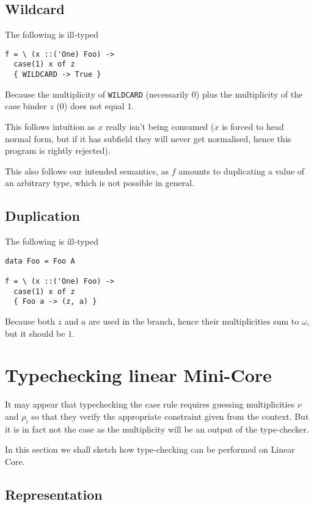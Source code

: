 \documentclass{article}
\begin{document}
\subsection{Wildcard}

The following is ill-typed
\begin{verbatim}
f = \ (x ::('One) Foo) ->
  case(1) x of z
  { WILDCARD -> True }
\end{verbatim}
Because the multiplicity of \verb+WILDCARD+ (necessarily $0$) plus the
multiplicity of the case binder $z$ ($0$) does not equal $1$.

This follows intuition as $x$ really isn't being consumed ($x$ is forced
to head normal form, but if it has subfield they will never get
normalised, hence this program is rightly rejected).

This also follows our intended semantics, as $f$ amounts to
duplicating a value of an arbitrary type, which is not possible in
general.

\subsection{Duplication}

The following is ill-typed
\begin{verbatim}
data Foo = Foo A

f = \ (x ::('One) Foo) ->
  case(1) x of z
  { Foo a -> (z, a) }
\end{verbatim}
Because both $z$ and $a$ are used in the branch, hence their
multiplicities sum to $ω$, but it should be $1$.

\section{Typechecking linear Mini-Core}

\newcommand{\type}[1]{\mathsf{type}(#1)}
\newcommand{\mult}[1]{\mathsf{mult}(#1)}
\newcommand{\typeof}[1]{\mathsf{typeOf}(#1)}

It may appear that typechecking the case rule requires guessing
multiplicities $ν$ and $ρ_i$ so that they verify the appropriate
constraint given from the context. But it is in fact not the case as
the multiplicity will be an output of the type-checker.

In this section we shall sketch how type-checking can be performed on
Linear Core.

\subsection{Representation}
\end{document}
